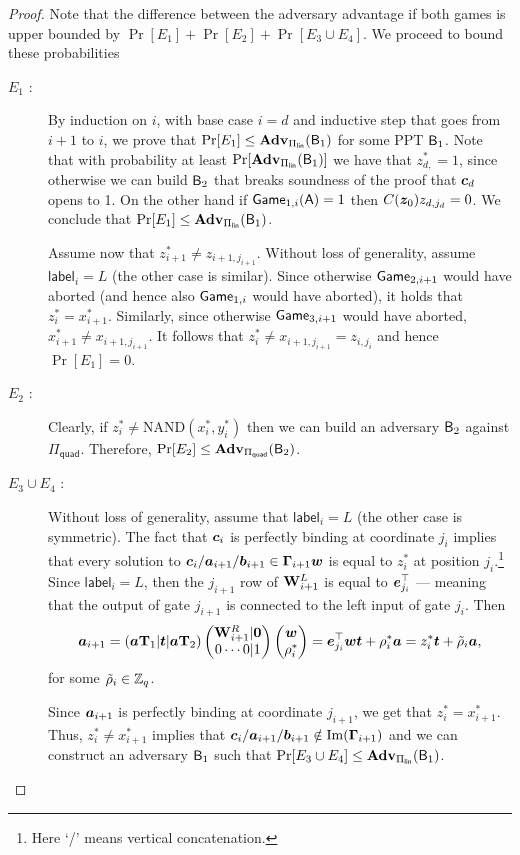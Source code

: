 \begin{proof}  Note that the difference between the adversary advantage if both games is upper bounded by $\Pr[E_1]+\Pr[E_2]+\Pr[E_3\cup E_4]$. We proceed to bound these probabilities

\begin{description}
\item[$E_1$ :]
By induction on $i$, with base case $i=d$ and inductive step that goes from $i+1$ to $i$, we prove that $\Pr[E_1]\leq \mathbf{Adv}_{\Pi_\mathsf{lin}}(\mathsf{B}_1)$ for some PPT $\mathsf{B}_1$. Note that with probability at least $\Pr[\mathbf{Adv}_{\Pi_\mathsf{lin}}(\mathsf{B}_1)]$ we have that $z^*_{d,} = 1$, since otherwise we can build $\mathsf{B}_2$ that breaks soundness of the proof that ${\boldsymbol{c}}_d$ opens to 1. On the other hand if $\mathsf{Game}_{1,i}(\mathsf{A})=1$ then $C({\boldsymbol{z}}_0)z_{d,j_d}=0$. We conclude that $\Pr[E_1]\leq \mathbf{Adv}_{\Pi_\mathsf{lin}}(\mathsf{B}_1)$.

Assume now that $z^*_{i+1}\neq z_{i+1,j_{i+1}}$. Without loss of generality, assume $\mathsf{label}_i = L$ (the other case is similar).
Since otherwise $\mathsf{Game}_{2,i+1}$ would have aborted (and hence also $\mathsf{Game}_{1,i}$ would have aborted), it holds that $z^*_i = x^*_{i+1}$. Similarly, since otherwise $\mathsf{Game}_{3,i+1}$ would have aborted, $x^*_{i+1} \neq x_{i+1,j_{i+1}}$. It follows that $z^*_i \neq x_{i+1,j_{i+1}}=z_{i,j_i}$ and hence $\Pr[E_1]=0$.

\item[$E_2$ :] Clearly, if $z^*_i \neq \mathrm{NAND}(x^*_i,y^*_i)$ then we can build an adversary $\mathsf{B}_2$ against $\Pi_\mathsf{quad}$. Therefore, $\Pr[E_2]\leq \mathbf{Adv}_{\Pi_\mathsf{quad}}(\mathsf{B}_2)$.

\item[$E_3\cup E_4$ :] Without loss of generality, assume that $\mathsf{label}_i = L$ (the other case is symmetric).
The fact that ${\boldsymbol{c}}_i$ is perfectly binding at coordinate $j_i$ implies that every solution to ${\boldsymbol{c}}_i/{\boldsymbol{a}}_{i+1}/{\boldsymbol{b}}_{i+1} \in \mathbf{{\Gamma}}_{i+1}{\boldsymbol{w}}$ is equal to $z^*_i$ at position $j_i$.\footnote{Here `/' means vertical concatenation.}
Since $\mathsf{label}_i = L$, then the $j_{i+1}$ row of $\mathbf{{W}}_{i+1}^L$ is equal to ${\boldsymbol{e}}^\top_{j_i}$ --- meaning that the output of gate $j_{i+1}$ is connected to the left input of gate $j_i$.
Then
$$
{\boldsymbol{a}}_{i+1} = 
	({\boldsymbol{a}}\mathbf{{T}}_1|{\boldsymbol{t}}|{\boldsymbol{a}}\mathbf{{T}}_2)\left(\begin{matrix}\mathbf{{W}}^R_{i+1}|{\boldsymbol{0}}\\0\cdots 0|1\end{matrix}\right)\left(\begin{matrix}{\boldsymbol{w}}\\\rho^*_i\end{matrix}\right) =
	{\boldsymbol{e}}_{j_i}^\top{\boldsymbol{w}}{\boldsymbol{t}}+ \rho^*_i{\boldsymbol{a}} = z_i^*{\boldsymbol{t}}+\tilde{\rho}_i{\boldsymbol{a}},
$$
for some $\tilde{\rho}_i\in\mathbb{Z}_q$.

Since ${\boldsymbol{a}}_{i+1}$ is perfectly binding at coordinate $j_{i+1}$, we get that $z^*_i = x^*_{i+1}$. Thus, $z^*_i \neq x^*_{i+1}$ implies that ${\boldsymbol{c}}_i/{\boldsymbol{a}}_{i+1}/{\boldsymbol{b}}_{i+1} \notin \mathrm{Im}(\mathbf{{\Gamma}}_{i+1})$ and we can construct an adversary $\mathsf{B}_1$ such that $\Pr[E_3\cup E_4] \leq \mathbf{Adv}_{\Pi_\mathsf{lin}}(\mathsf{B}_1)$.
\end{description}
\end{proof}

